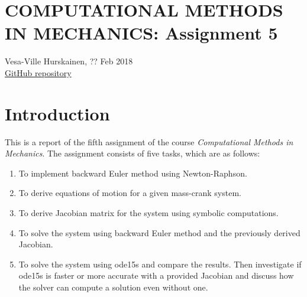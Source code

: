 \documentclass{article}
\begin{document}
	\section*{COMPUTATIONAL METHODS IN MECHANICS: Assignment 5}
	Vesa-Ville Hurskainen, ?? Feb 2018\\
	\href{https://github.com/VesaVilleHurskainen/cmim2018}{GitHub repository}

	\section*{Introduction}
	This is a report of the fifth assignment of the course \textit{Computational Methods in Mechanics}. The assignment consists of five tasks, which are as follows:
	
	\begin{enumerate}
		\setlength\itemsep{0pt}
		\item To implement backward Euler method using Newton-Raphson.
		\item To derive equations of motion for a given mass-crank system.
		\item To derive Jacobian matrix for the system using symbolic computations.
		\item To solve the system using backward Euler method and the previously derived Jacobian.
		\item To solve the system using ode15s and compare the results. Then investigate if ode15s is faster or more accurate with a provided Jacobian and discuss how the solver can compute a solution even without one.
	\end{enumerate}
\end{document}
